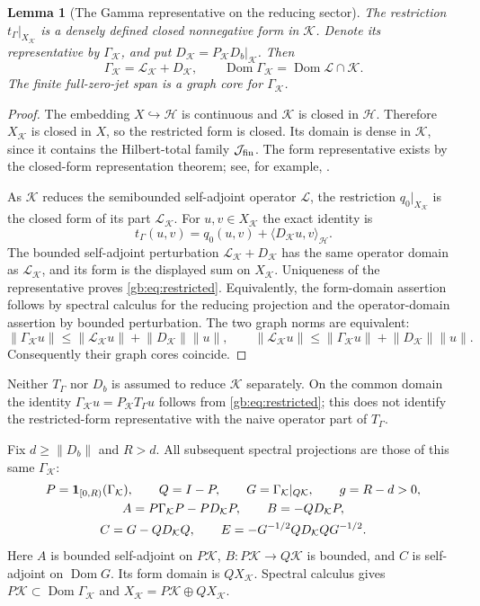 \documentclass[11pt,a4paper]{article}
\numberwithin{equation}{section}
\newtheorem{lemma}[theorem]{Lemma}
\theoremstyle{definition}\newtheorem{definition}[theorem]{Definition}
\theoremstyle{remark}\newtheorem{remark}[theorem]{Remark}
\newcommand{\Hh}{\mathcal H}\newcommand{\Hw}{\mathcal H}
\newcommand{\tg}{t_\Gamma}\newcommand{\cg}{c_\Gamma}
\newcommand{\dom}{\operatorname{Dom}}\newcommand{\Var}{\operatorname{Var}}
\newcommand{\ip}[2]{\langle#1,#2\rangle}\newcommand{\norm}[1]{\lVert#1\rVert}\newcommand{\abs}[1]{\lvert#1\rvert}
\newcommand{\Kk}{\mathcal K}\newcommand{\Aa}{\mathcal A}\newcommand{\Ff}{\mathcal F}
\begin{document}
\begin{lemma}[The Gamma representative on the reducing sector]
\label{gb:lem:restricted}
The restriction $\tg|_{X_\Kk}$ is a densely defined closed nonnegative
form in $\Kk$. Denote its representative by $\Gamma_\Kk$, and put
$D_\Kk=P_\Kk D_b|_\Kk$. Then
\begin{equation}\label{gb:eq:restricted}
 \Gamma_\Kk=\mathcal L_\Kk+D_\Kk,\qquad
 \dom\Gamma_\Kk=\dom\mathcal L\cap\Kk.
\end{equation}
The finite full-zero-jet span is a graph core for $\Gamma_\Kk$.
\end{lemma}
\begin{proof}
The embedding $X\hookrightarrow\Hh$ is continuous and $\Kk$ is closed
in $\Hh$. Therefore $X_\Kk$ is closed in $X$, so the restricted form
is closed. Its domain is dense in $\Kk$, since it contains the
Hilbert-total family $\mathcal J_{\rm fin}$.
The form representative exists by the closed-form representation theorem;
see, for example, \cite[Theorem 2.13]{gbTeschl}.

As $\Kk$ reduces the semibounded self-adjoint operator $\mathcal L$,
the restriction $q_0|_{X_\Kk}$ is the closed form of its part
$\mathcal L_\Kk$. For $u,v\in X_\Kk$ the exact identity is
\[
 \tg(u,v)=q_0(u,v)+\ip{D_\Kk u}{v}_{\Hh}.
\]
The bounded self-adjoint perturbation $\mathcal L_\Kk+D_\Kk$ has
the same operator domain as $\mathcal L_\Kk$, and its form is the
displayed sum on $X_\Kk$. Uniqueness of the representative proves
\eqref{gb:eq:restricted}. Equivalently, the form-domain assertion follows
by spectral calculus for the reducing projection and the operator-domain
assertion by bounded perturbation. The two graph norms are equivalent:
\[
 \norm{\Gamma_\Kk u}\le\norm{\mathcal L_\Kk u}
       +\norm{D_\Kk}\norm u,\qquad
 \norm{\mathcal L_\Kk u}\le\norm{\Gamma_\Kk u}
       +\norm{D_\Kk}\norm u.
\]
Consequently their graph cores coincide.
\end{proof}
Neither $T_\Gamma$ nor $D_b$ is assumed to reduce $\Kk$ separately.
On the common domain the identity
$\Gamma_\Kk u=P_\Kk T_\Gamma u$ follows from
\eqref{gb:eq:restricted}; this does not identify the restricted-form
representative with the naive operator part of $T_\Gamma$.

Fix $d\ge\norm{D_b}$ and $R>d$. All subsequent spectral projections
are those of this same $\Gamma_\Kk$:
\begin{gather}
 P=\mathbf1_{[0,R)}(\Gamma_\Kk),\qquad Q=I-P,\qquad
 G=\Gamma_\Kk|_{Q\Kk},\qquad g=R-d>0,\notag\\
 A=P\Gamma_\Kk P-PD_\Kk P,\qquad B=-QD_\Kk P,\notag\\
 C=G-QD_\Kk Q,\qquad
 E=-G^{-1/2}QD_\Kk QG^{-1/2}.\label{gb:eq:blocks}
\end{gather}
Here $A$ is bounded self-adjoint on $P\Kk$, $B:P\Kk\to Q\Kk$
is bounded, and $C$ is self-adjoint on $\dom G$. Its form domain is
$QX_\Kk$. Spectral calculus gives $P\Kk\subset\dom\Gamma_\Kk$
and $X_\Kk=P\Kk\oplus QX_\Kk$.
\end{document}
